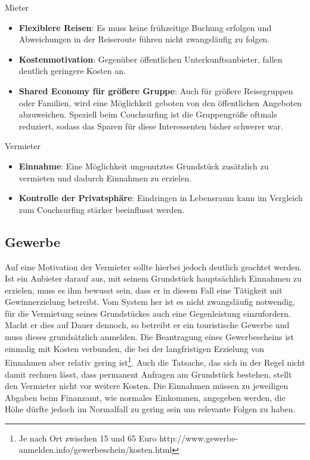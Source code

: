 Mieter
\begin{itemize}
   \item 
   \textbf{Flexiblere Reisen}: Es muss keine frühzeitige Buchung erfolgen und Abweichungen in der Reiseroute führen nicht zwangsläufig zu folgen.

   \item 
   \textbf{Kostenmotivation}: Gegenüber öffentlichen Unterkunftsanbieter, fallen deutlich geringere Kosten an. 

   \item 
   \textbf{Shared Economy für größere Gruppe}: Auch für größere Reisegruppen oder Familien, wird eine Möglichkeit geboten von den öffentlichen Angeboten abzuweichen. Speziell beim Couchsurfing ist die Gruppengröße oftmals reduziert, sodass das Sparen für diese Interessenten bisher schwerer war.

\end{itemize}

Vermieter
\begin{itemize}
   \item 
   \textbf{Einnahme}: Eine Möglichkeit ungenutztes Grundstück zusätzlich zu vermieten und dadurch Einnahmen zu erzielen.

   \item 
   \textbf{Kontrolle der Privatsphäre}: Eindringen in Lebensraum kann im Vergleich zum Couchsurfing stärker beeinflusst werden.
   
\end{itemize}

\newpage

\subsection{Gewerbe}
Auf eine Motivation der Vermieter sollte hierbei jedoch deutlich geachtet werden. Ist ein Anbieter darauf aus, mit seinem Grundstück hauptsächlich Einnahmen zu erzielen, muss es ihm bewusst sein, dass er in diesem Fall eine Tätigkeit mit Gewinnerzielung betreibt. Vom System her ist es nicht zwangsläufig notwendig, für die Vermietung seines Grundstückes auch eine Gegenleistung einzufordern. Macht er dies auf Dauer dennoch, so betreibt er ein touristische Gewerbe und muss dieses grundsätzlich anmelden. Die Beantragung eines Gewerbescheins ist einmalig mit Kosten verbunden, die bei der langfristigen Erzielung von Einnahmen aber relativ gering ist\footnote{Je nach Ort zwischen 15 und 65 Euro http://www.gewerbe-anmelden.info/gewerbeschein/kosten.html}. Auch die Tatsache, das sich in der Regel nicht damit rechnen lässt, dass permanent Anfragen am Grundstück bestehen, stellt den Vermieter nicht vor weitere Kosten. Die Einnahmen müssen zu jeweiligen Abgaben beim Finanzamt, wie normales Einkommen, angegeben werden, die Höhe dürfte jedoch im Normalfall zu gering sein um relevante Folgen zu haben.\\

